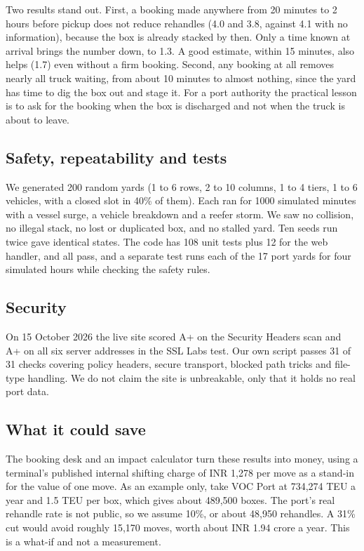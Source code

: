 \documentclass[conference]{IEEEtran}
\begin{document}
Two results stand out. First, a booking made anywhere from 20 minutes to 2 hours before pickup does not reduce rehandles (4.0 and 3.8, against 4.1 with no information), because the box is already stacked by then. Only a time known at arrival brings the number down, to 1.3. A good estimate, within 15 minutes, also helps (1.7) even without a firm booking. Second, any booking at all removes nearly all truck waiting, from about 10 minutes to almost nothing, since the yard has time to dig the box out and stage it. For a port authority the practical lesson is to ask for the booking when the box is discharged and not when the truck is about to leave.

\subsection{Safety, repeatability and tests}
We generated 200 random yards (1 to 6 rows, 2 to 10 columns, 1 to 4 tiers, 1 to 6 vehicles, with a closed slot in 40\% of them). Each ran for 1000 simulated minutes with a vessel surge, a vehicle breakdown and a reefer storm. We saw no collision, no illegal stack, no lost or duplicated box, and no stalled yard. Ten seeds run twice gave identical states. The code has 108 unit tests plus 12 for the web handler, and all pass, and a separate test runs each of the 17 port yards for four simulated hours while checking the safety rules.

\subsection{Security}
On 15 October 2026 the live site scored A+ on the Security Headers scan and A+ on all six server addresses in the SSL Labs test. Our own script passes 31 of 31 checks covering policy headers, secure transport, blocked path tricks and file-type handling. We do not claim the site is unbreakable, only that it holds no real port data.

\subsection{What it could save}
The booking desk and an impact calculator turn these results into money, using a terminal's published internal shifting charge of INR 1,278 per move as a stand-in for the value of one move. As an example only, take VOC Port at 734,274 TEU a year and 1.5 TEU per box, which gives about 489,500 boxes. The port's real rehandle rate is not public, so we assume 10\%, or about 48,950 rehandles. A 31\% cut would avoid roughly 15,170 moves, worth about INR 1.94 crore a year. This is a what-if and not a measurement.
\end{document}
